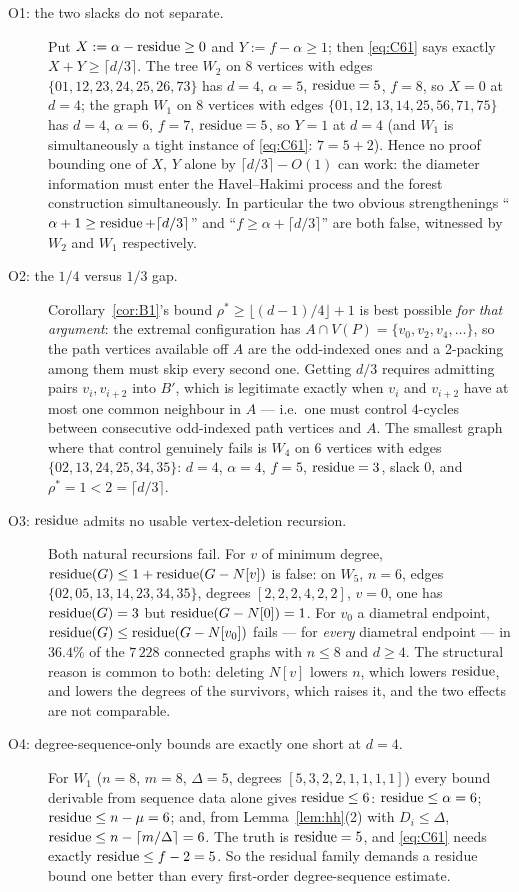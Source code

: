 \begin{description}
\item[O1: the two slacks do not separate.] Put $X := \alpha - \operatorname{residue} \ge 0$ and
$Y := f - \alpha \ge 1$; then \eqref{eq:C61} says exactly $X + Y \ge \lceil d/3 \rceil$.
The tree $W_2$ on $8$ vertices with edges
$\{01,12,23,24,25,26,73\}$ has $d = 4$, $\alpha = 5$, $\operatorname{residue} = 5$, $f = 8$, so $X = 0$ at
$d = 4$; the graph $W_1$ on $8$ vertices with edges
$\{01,12,13,14,25,56,71,75\}$ has $d = 4$, $\alpha = 6$, $f = 7$, $\operatorname{residue} = 5$, so $Y = 1$ at
$d = 4$ (and $W_1$ is simultaneously a tight instance of \eqref{eq:C61}: $7 = 5+2$). Hence
no proof bounding one of $X$, $Y$ alone by $\lceil d/3 \rceil - O(1)$ can work: the
diameter information must enter the Havel--Hakimi process and the forest construction
simultaneously. In particular the two obvious strengthenings
``$\alpha + 1 \ge \operatorname{residue} + \lceil d/3 \rceil$'' and ``$f \ge \alpha + \lceil d/3 \rceil$''
are both false, witnessed by $W_2$ and $W_1$ respectively.

\item[O2: the $1/4$ versus $1/3$ gap.] Corollary~\ref{cor:B1}'s bound
$\rho^{*} \ge \lfloor (d-1)/4 \rfloor + 1$ is best possible \emph{for that argument}: the
extremal configuration has $A \cap V(P) = \{v_0,v_2,v_4,\dots\}$, so the path vertices
available off $A$ are the odd-indexed ones and a 2-packing among them must skip every
second one. Getting $d/3$ requires admitting pairs $v_i, v_{i+2}$ into $B'$, which is
legitimate exactly when $v_i$ and $v_{i+2}$ have at most one common neighbour in $A$ ---
i.e.\ one must control $4$-cycles between consecutive odd-indexed path vertices and $A$.
The smallest graph where that control genuinely fails is $W_4$ on $6$ vertices with edges
$\{02,13,24,25,34,35\}$: $d = 4$, $\alpha = 4$, $f = 5$, $\operatorname{residue} = 3$, slack $0$, and
$\rho^{*} = 1 < 2 = \lceil d/3 \rceil$.

\item[O3: $\operatorname{residue}$ admits no usable vertex-deletion recursion.] Both natural recursions fail.
For $v$ of minimum degree, $\operatorname{residue}(G) \le 1 + \operatorname{residue}(G - N[v])$ is false: on $W_5$, $n=6$, edges
$\{02,05,13,14,23,34,35\}$, degrees $[2,2,2,4,2,2]$, $v = 0$, one has $\operatorname{residue}(G) = 3$ but
$\operatorname{residue}(G - N[0]) = 1$. For $v_0$ a diametral endpoint, $\operatorname{residue}(G) \le \operatorname{residue}(G - N[v_0])$ fails
--- for \emph{every} diametral endpoint --- in $36.4\%$ of the $7\,228$ connected graphs
with $n \le 8$ and $d \ge 4$. The structural reason is common to both: deleting $N[v]$
lowers $n$, which lowers $\operatorname{residue}$, and lowers the degrees of the survivors, which raises it,
and the two effects are not comparable.

\item[O4: degree-sequence-only bounds are exactly one short at $d = 4$.] For $W_1$
($n=8$, $m=8$, $\Delta=5$, degrees $[5,3,2,2,1,1,1,1]$) every bound derivable from sequence
data alone gives $\operatorname{residue} \le 6$: $\operatorname{residue} \le \alpha = 6$; $\operatorname{residue} \le n - \mu = 6$; and, from
Lemma~\ref{lem:hh}(2) with $D_i \le \Delta$, $\operatorname{residue} \le n - \lceil m/\Delta \rceil = 6$. The
truth is $\operatorname{residue} = 5$, and \eqref{eq:C61} needs exactly $\operatorname{residue} \le f - 2 = 5$. So the residual
family demands a residue bound one better than every first-order degree-sequence estimate.
\end{description}

